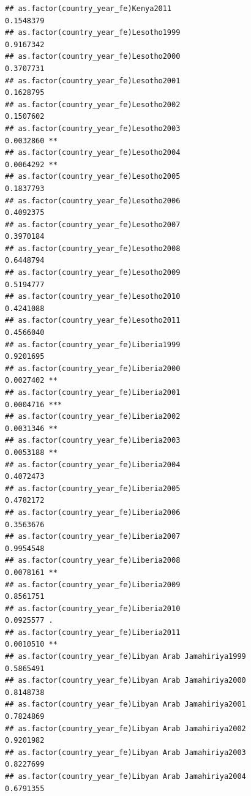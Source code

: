 \documentclass[
  a4paper,
]{article}
\begin{document}
\begin{verbatim}
## as.factor(country_year_fe)Kenya2011                            0.1548379    
## as.factor(country_year_fe)Lesotho1999                          0.9167342    
## as.factor(country_year_fe)Lesotho2000                          0.3707731    
## as.factor(country_year_fe)Lesotho2001                          0.1628795    
## as.factor(country_year_fe)Lesotho2002                          0.1507602    
## as.factor(country_year_fe)Lesotho2003                          0.0032860 ** 
## as.factor(country_year_fe)Lesotho2004                          0.0064292 ** 
## as.factor(country_year_fe)Lesotho2005                          0.1837793    
## as.factor(country_year_fe)Lesotho2006                          0.4092375    
## as.factor(country_year_fe)Lesotho2007                          0.3970184    
## as.factor(country_year_fe)Lesotho2008                          0.6448794    
## as.factor(country_year_fe)Lesotho2009                          0.5194777    
## as.factor(country_year_fe)Lesotho2010                          0.4241088    
## as.factor(country_year_fe)Lesotho2011                          0.4566040    
## as.factor(country_year_fe)Liberia1999                          0.9201695    
## as.factor(country_year_fe)Liberia2000                          0.0027402 ** 
## as.factor(country_year_fe)Liberia2001                          0.0004716 ***
## as.factor(country_year_fe)Liberia2002                          0.0031346 ** 
## as.factor(country_year_fe)Liberia2003                          0.0053188 ** 
## as.factor(country_year_fe)Liberia2004                          0.4072473    
## as.factor(country_year_fe)Liberia2005                          0.4782172    
## as.factor(country_year_fe)Liberia2006                          0.3563676    
## as.factor(country_year_fe)Liberia2007                          0.9954548    
## as.factor(country_year_fe)Liberia2008                          0.0078161 ** 
## as.factor(country_year_fe)Liberia2009                          0.8561751    
## as.factor(country_year_fe)Liberia2010                          0.0925577 .  
## as.factor(country_year_fe)Liberia2011                          0.0010510 ** 
## as.factor(country_year_fe)Libyan Arab Jamahiriya1999           0.5865491    
## as.factor(country_year_fe)Libyan Arab Jamahiriya2000           0.8148738    
## as.factor(country_year_fe)Libyan Arab Jamahiriya2001           0.7824869    
## as.factor(country_year_fe)Libyan Arab Jamahiriya2002           0.9201982    
## as.factor(country_year_fe)Libyan Arab Jamahiriya2003           0.8227699    
## as.factor(country_year_fe)Libyan Arab Jamahiriya2004           0.6791355    

\end{verbatim}
\end{document}
